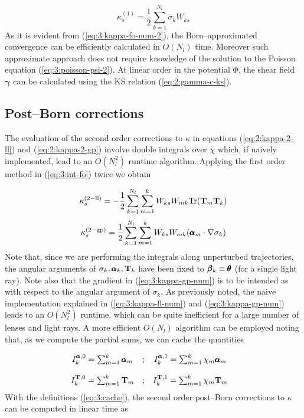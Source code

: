\begin{equation}
\label{eq:3:kappa-fo-num-2}
\kappa^{(1)}_s = \frac{1}{2}\sum_{k=1}^{N_l} \sigma_k W_{ks}
\end{equation}
%
As it is evident from (\ref{eq:3:kappa-fo-num-2}), the Born--approximated convergence can be efficiently calculated in $O(N_l)$ time. Moreover such approximate approach does not require knowledge of the solution to the Poisson equation (\ref{eq:3:poisson-psi-2}). At linear order in the potential $\Phi$, the shear field $\pmb{\gamma}$ can be calculated using the KS relation (\ref{eq:2:gamma-c-ks}).  

\subsection{Post--Born corrections}
The evaluation of the second order corrections to $\kappa$ in equations (\ref{eq:2:kappa-2-ll}) and (\ref{eq:2:kappa-2-gp}) involve double integrals over $\chi$ which, if naively implemented, lead to an $O(N_l^2)$ runtime algorithm. Applying the first order method in (\ref{eq:3:int-fo}) twice we obtain

\begin{equation}
\label{eq:3:kappa-ll-num}
\kappa_s^{(2-{\rm ll})} = -\frac{1}{2}\sum_{k=1}^{N_l}\sum_{m=1}^k W_{ks}W_{mk} {\rm Tr}(\mathbf{T}_m\mathbf{T}_k)
\end{equation}
%
\begin{equation}
\label{eq:3:kappa-gp-num}
\kappa_s^{(2-{\rm gp})} = \frac{1}{2}\sum_{k=1}^{N_l}\sum_{m=1}^k W_{ks}W_{mk} (\pmb{\alpha}_m\cdot\nabla\sigma_k)
\end{equation}
%
Note that, since we are performing the integrals along unperturbed trajectories, the angular arguments of $\sigma_k,\pmb{\alpha}_k,\mathbf{T}_k$ have been fixed to $\pmb{\beta}_k\equiv\pmb{\theta}$ (for a single light ray). Note also that the gradient in (\ref{eq:3:kappa-gp-num}) is to be intended as with respect to the angular argument of $\sigma_k$. As previously noted, the naive implementation explained in (\ref{eq:3:kappa-ll-num}) and (\ref{eq:3:kappa-gp-num}) leads to an $O(N_l^2)$ runtime, which can be quite inefficient for a large number of lenses and light rays. A more efficient $O(N_l)$ algorithm can be employed noting that, as we compute the partial sums, we can cache the quantities 

\begin{equation}
\label{eq:3:cache}
\begin{matrix}
I^{\pmb{\alpha},0}_k = \sum_{m=1}^k \pmb{\alpha}_m & ; & I^{\pmb{\alpha},1}_k = \sum_{m=1}^k \chi_m\pmb{\alpha}_m & \\ \\
I^{\mathbf{T},0}_k = \sum_{m=1}^k \mathbf{T}_m & ; & I^{\mathbf{T},1}_k = \sum_{m=1}^k \chi_m\mathbf{T}_m 
\end{matrix} 
\end{equation} 
%
With the definitions (\ref{eq:3:cache}), the second order post--Born corrections to $\kappa$ can be computed in linear time as  

